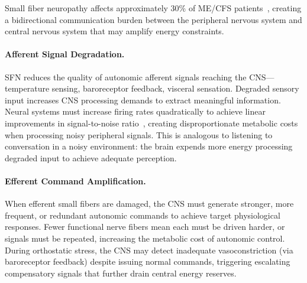 \begin{speculation}
\label{spec:sfn-interface-failure}
Small fiber neuropathy affects approximately 30\% of ME/CFS patients~\cite{Azcue2023sfn,Azcue2025sfn}, creating a bidirectional communication burden between the peripheral nervous system and central nervous system that may amplify energy constraints.

\paragraph{Afferent Signal Degradation.}
SFN reduces the quality of autonomic afferent signals reaching the CNS---temperature sensing, baroreceptor feedback, visceral sensation. Degraded sensory input increases CNS processing demands to extract meaningful information. Neural systems must increase firing rates quadratically to achieve linear improvements in signal-to-noise ratio~\cite{Laughlin2003energy}, creating disproportionate metabolic costs when processing noisy peripheral signals. This is analogous to listening to conversation in a noisy environment: the brain expends more energy processing degraded input to achieve adequate perception.

\paragraph{Efferent Command Amplification.}
When efferent small fibers are damaged, the CNS must generate stronger, more frequent, or redundant autonomic commands to achieve target physiological responses. Fewer functional nerve fibers mean each must be driven harder, or signals must be repeated, increasing the metabolic cost of autonomic control. During orthostatic stress, the CNS may detect inadequate vasoconstriction (via baroreceptor feedback) despite issuing normal commands, triggering escalating compensatory signals that further drain central energy reserves.


\end{speculation}
